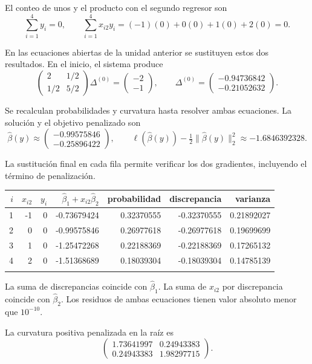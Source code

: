 \documentclass[11pt,a4paper]{article}
\begin{document}
El conteo de unos y el producto con el segundo regresor son
\[
\sum_{i=1}^4 y_i=0,\qquad\sum_{i=1}^4x_{i2}y_i=(-1)(0)+0(0)+1(0)+2(0)=0.
\]

En las ecuaciones abiertas de la unidad anterior se sustituyen
estos dos resultados. En el inicio, el sistema produce
\[
\begin{pmatrix}2&1/2\\1/2&5/2\end{pmatrix}\Delta^{(0)}=\begin{pmatrix}-2\\-1\end{pmatrix},\qquad\Delta^{(0)}=\begin{pmatrix}-0.94736842\\-0.21052632\end{pmatrix}.
\]

Se recalculan probabilidades y curvatura hasta resolver
ambas ecuaciones. La solución y el objetivo penalizado son
\[
\widehat\beta(y)\approx\begin{pmatrix}-0.99575846\\-0.25896422\end{pmatrix},\qquad \ell(\widehat\beta(y))-\tfrac12\|\widehat\beta(y)\|_2^2\approx-1.6846392328.
\]

La sustitución final en cada fila permite verificar
los dos gradientes, incluyendo el término de penalización.
\begin{center}\scriptsize
\begin{tabular}{rrrrrrr}\toprule
\(i\)&\(x_{i2}\)&\(y_i\)&\(\widehat\beta_1+x_{i2}\widehat\beta_2\)&probabilidad&discrepancia&varianza\\\midrule
1&-1&0&-0.73679424&0.32370555&-0.32370555&0.21892027\\
2&0&0&-0.99575846&0.26977618&-0.26977618&0.19699699\\
3&1&0&-1.25472268&0.22188369&-0.22188369&0.17265132\\
4&2&0&-1.51368689&0.18039304&-0.18039304&0.14785139\\
\\\bottomrule\end{tabular}\end{center}
La suma de discrepancias coincide con \(\widehat\beta_1\).
La suma de \(x_{i2}\) por discrepancia coincide con
\(\widehat\beta_2\). Los residuos de ambas ecuaciones
tienen valor absoluto menor que \(10^{-10}\).

La curvatura positiva penalizada en la raíz es
\[
\begin{pmatrix}1.73641997&0.24943383\\0.24943383&1.98297715\end{pmatrix}.
\]
\end{document}
